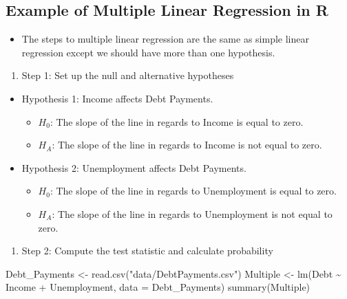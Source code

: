 \documentclass[
  letterpaper,
  DIV=11,
  numbers=noendperiod]{scrreprt}
\newenvironment{Shaded}{\begin{snugshade}}{\end{snugshade}}
\newcommand{\AttributeTok}[1]{\textcolor[rgb]{0.40,0.45,0.13}{#1}}
\newcommand{\FunctionTok}[1]{\textcolor[rgb]{0.28,0.35,0.67}{#1}}
\newcommand{\NormalTok}[1]{\textcolor[rgb]{0.00,0.23,0.31}{#1}}
\newcommand{\OtherTok}[1]{\textcolor[rgb]{0.00,0.23,0.31}{#1}}
\newcommand{\SpecialCharTok}[1]{\textcolor[rgb]{0.37,0.37,0.37}{#1}}
\newcommand{\StringTok}[1]{\textcolor[rgb]{0.13,0.47,0.30}{#1}}
\providecommand{\tightlist}{%
  \setlength{\itemsep}{0pt}\setlength{\parskip}{0pt}}\usepackage{longtable,booktabs,array}
\begin{document}
\subsection{Example of Multiple Linear Regression in
R}\label{example-of-multiple-linear-regression-in-r}

\begin{itemize}
\tightlist
\item
  The steps to multiple linear regression are the same as simple linear
  regression except we should have more than one hypothesis.
\end{itemize}

\begin{enumerate}
\def\labelenumi{\arabic{enumi}.}
\tightlist
\item
  Step 1: Set up the null and alternative hypotheses
\end{enumerate}

\begin{itemize}
\tightlist
\item
  Hypothesis 1: Income affects Debt Payments.

  \begin{itemize}
  \tightlist
  \item
    \(H_0\): The slope of the line in regards to Income is equal to
    zero.
  \item
    \(H_A\): The slope of the line in regards to Income is not equal to
    zero.
  \end{itemize}
\item
  Hypothesis 2: Unemployment affects Debt Payments.

  \begin{itemize}
  \tightlist
  \item
    \(H_0\): The slope of the line in regards to Unemployment is equal
    to zero.
  \item
    \(H_A\): The slope of the line in regards to Unemployment is not
    equal to zero.
  \end{itemize}
\end{itemize}

\begin{enumerate}
\def\labelenumi{\arabic{enumi}.}
\setcounter{enumi}{1}
\tightlist
\item
  Step 2: Compute the test statistic and calculate probability
\end{enumerate}

\begin{Shaded}
\begin{Highlighting}[]
\NormalTok{Debt\_Payments }\OtherTok{\textless{}{-}} \FunctionTok{read.csv}\NormalTok{(}\StringTok{"data/DebtPayments.csv"}\NormalTok{)}
\NormalTok{Multiple }\OtherTok{\textless{}{-}} \FunctionTok{lm}\NormalTok{(Debt }\SpecialCharTok{\textasciitilde{}}\NormalTok{ Income }\SpecialCharTok{+}\NormalTok{ Unemployment, }\AttributeTok{data =}\NormalTok{ Debt\_Payments)}
\FunctionTok{summary}\NormalTok{(Multiple)}
\end{Highlighting}
\end{Shaded}
\end{document}
